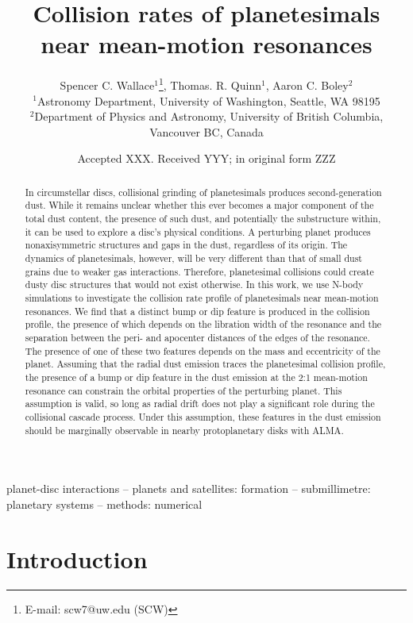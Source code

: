 \documentclass[fleqn,usenatbib]{mnras}
\title[Collision rates of planetesimals]{Collision rates of planetesimals near mean-motion resonances}
\author[S. C. Wallace et al.]{
Spencer C. Wallace$^{1}$\thanks{E-mail: scw7@uw.edu (SCW)},
Thomas. R. Quinn$^{1}$,
Aaron C. Boley$^{2}$
\\
$^{1}$Astronomy Department, University of Washington, Seattle, WA 98195\\
$^{2}$Department of Physics and Astronomy, University of British Columbia, Vancouver BC, Canada
}
\date{Accepted XXX. Received YYY; in original form ZZZ}
\begin{document}
\label{firstpage}
\pagerange{\pageref{firstpage}--\pageref{lastpage}}
\maketitle

\begin{abstract}
In circumstellar discs, collisional grinding of planetesimals produces second-generation dust. While it remains unclear whether this ever becomes a major component of the total dust content, the presence of such dust, and potentially the substructure within, it can be used to explore a disc's physical conditions. A perturbing planet produces nonaxisymmetric structures and gaps in the dust, regardless of its origin. The dynamics of planetesimals, however, will be very different than that of small dust grains due to weaker gas interactions. Therefore, planetesimal collisions could create dusty disc structures that would not exist otherwise. In this work, we use N-body simulations to investigate the collision rate profile of planetesimals near mean-motion resonances. We find that a distinct bump or dip feature is produced in the collision profile, the presence of which depends on the libration width of the resonance and the separation between the peri- and apocenter distances of the edges of the resonance. The presence of one of these two features depends on the mass and eccentricity of the planet. Assuming that the radial dust emission traces the planetesimal collision profile, the presence of a bump or dip feature in the dust emission at the 2:1 mean-motion resonance can constrain the orbital properties of the perturbing planet. This assumption is valid, so long as radial drift does not play a significant role during the collisional cascade process. Under this assumption, these features in the dust emission should be marginally observable in nearby protoplanetary disks with ALMA.
\end{abstract}

\begin{keywords}
planet-disc interactions -- planets and satellites: formation -- submillimetre: planetary systems -- methods: numerical
\end{keywords}

\section{Introduction} \label{sec:intro}
\end{document}
